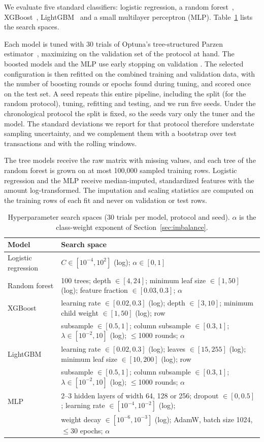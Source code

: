 We evaluate five standard classifiers: logistic regression, a random forest~\cite{breiman2001random}, XGBoost~\cite{chen2016xgboost}, LightGBM~\cite{ke2017lightgbm} and a small multilayer perceptron (MLP). Table~\ref{tab:space} lists the search spaces.

Each model is tuned with 30 trials of Optuna's tree-structured Parzen estimator~\cite{akiba2019optuna}, maximizing \prauc{} on the validation set of the protocol at hand. The boosted models and the MLP use early stopping on validation \prauc{}. The selected configuration is then refitted on the combined training and validation data, with the number of boosting rounds or epochs found during tuning, and scored once on the test set. A seed repeats this entire pipeline, including the split (for the random protocol), tuning, refitting and testing, and we run five seeds. Under the chronological protocol the split is fixed, so the seeds vary only the tuner and the model. The standard deviations we report for that protocol therefore understate sampling uncertainty, and we complement them with a bootstrap over test transactions and with the rolling windows.

The tree models receive the raw matrix with missing values, and each tree of the random forest is grown on at most 100{,}000 sampled training rows. Logistic regression and the MLP receive median-imputed, standardized features with the amount log-transformed. The imputation and scaling statistics are computed on the training rows of each fit and never on validation or test rows.

\begin{table}[htbp]
\caption{Hyperparameter search spaces (30 trials per model, protocol and seed). $\alpha$ is the class-weight exponent of Section~\ref{sec:imbalance}.}
\label{tab:space}
\footnotesize
\begin{tabular}{ll}
\toprule
Model & Search space \\
\midrule
Logistic regression & $C \in [10^{-4}, 10^{2}]$ (log); $\alpha \in [0,1]$ \\
Random forest & 100 trees; depth $\in [4,24]$; minimum leaf size $\in [1,50]$ (log); feature fraction $\in [0.03,0.3]$; $\alpha$ \\
XGBoost & learning rate $\in [0.02,0.3]$ (log); depth $\in [3,10]$; minimum child weight $\in [1,50]$ (log); row \\
 & subsample $\in [0.5,1]$; column subsample $\in [0.3,1]$; $\lambda \in [10^{-2},10]$ (log); $\le$1000 rounds; $\alpha$ \\
LightGBM & learning rate $\in [0.02,0.3]$ (log); leaves $\in [15,255]$ (log); minimum leaf size $\in [10,200]$ (log); row \\
 & subsample $\in [0.5,1]$; column subsample $\in [0.3,1]$; $\lambda \in [10^{-2},10]$ (log); $\le$1000 rounds; $\alpha$ \\
MLP & 2--3 hidden layers of width 64, 128 or 256; dropout $\in [0,0.5]$; learning rate $\in [10^{-4},10^{-2}]$ (log); \\
 & weight decay $\in [10^{-6},10^{-3}]$ (log); AdamW, batch size 1024, $\le$30 epochs; $\alpha$ \\
\bottomrule
\end{tabular}
\end{table}


